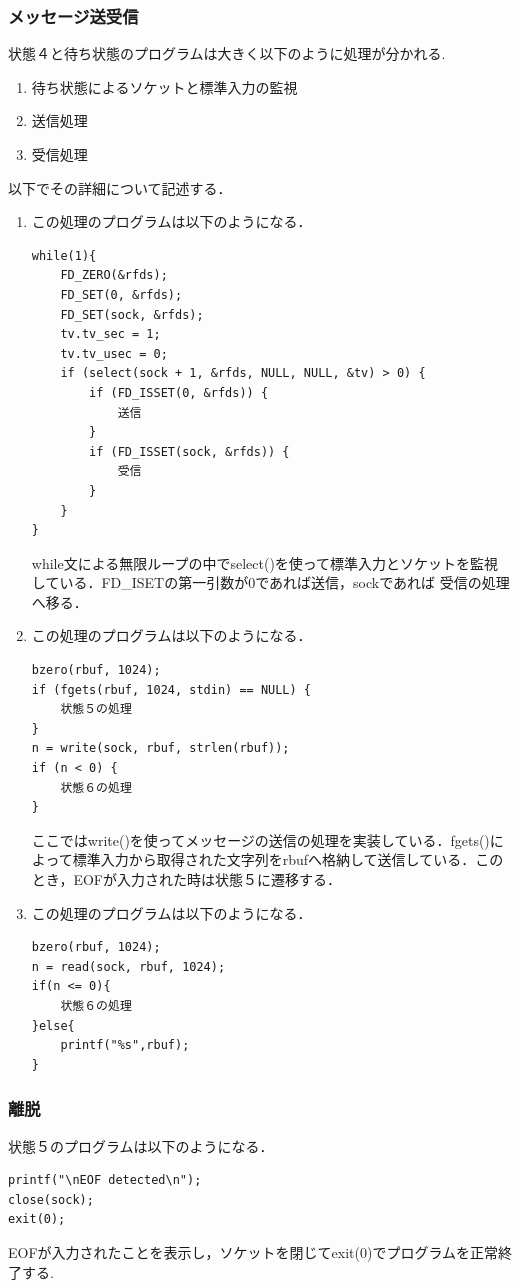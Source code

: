 \documentclass[dvipdfmx]{jarticle}
\begin{document}
\subsubsection{メッセージ送受信}
状態４と待ち状態のプログラムは大きく以下のように処理が分かれる.
\begin{enumerate}
    \item 待ち状態によるソケットと標準入力の監視
    \item 送信処理
    \item 受信処理
\end{enumerate}
以下でその詳細について記述する．
\begin{enumerate}
    \item この処理のプログラムは以下のようになる．
    \begin{lstlisting}
while(1){
    FD_ZERO(&rfds);
    FD_SET(0, &rfds);
    FD_SET(sock, &rfds);
    tv.tv_sec = 1;
    tv.tv_usec = 0;
    if (select(sock + 1, &rfds, NULL, NULL, &tv) > 0) {
        if (FD_ISSET(0, &rfds)) {
            送信      
        }
        if (FD_ISSET(sock, &rfds)) {
            受信
        }
    }
} 
    \end{lstlisting}
    while文による無限ループの中でselect()を使って標準入力とソケットを監視している．FD\_ISETの第一引数が0であれば送信，sockであれば
    受信の処理へ移る．
    \item この処理のプログラムは以下のようになる．
    \begin{lstlisting}
bzero(rbuf, 1024);
if (fgets(rbuf, 1024, stdin) == NULL) {
    状態５の処理
}
n = write(sock, rbuf, strlen(rbuf));
if (n < 0) {
    状態６の処理
}
    \end{lstlisting}
    ここではwrite()を使ってメッセージの送信の処理を実装している．fgets()によって標準入力から取得された文字列をrbufへ格納して送信している．このとき，EOFが入力された時は状態５に遷移する．
    \item この処理のプログラムは以下のようになる．
    \begin{lstlisting}
bzero(rbuf, 1024);
n = read(sock, rbuf, 1024);
if(n <= 0){
    状態６の処理
}else{
    printf("%s",rbuf);
}
    \end{lstlisting}
\end{enumerate}
\subsubsection{離脱}
状態５のプログラムは以下のようになる．
\begin{lstlisting}
printf("\nEOF detected\n");
close(sock);
exit(0);
\end{lstlisting}
EOFが入力されたことを表示し，ソケットを閉じてexit(0)でプログラムを正常終了する.
\end{document}
